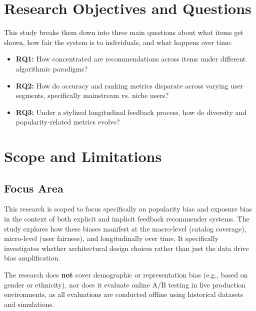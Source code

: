 \documentclass[11pt,a4paper]{report}
\begin{document}
\section{Research Objectives and Questions}
This study breaks them down into three main questions about what items get shown, how fair the system is to individuals, and what happens over time:

\begin{itemize}
    \item \textbf{RQ1:} How concentrated are recommendations across items under different algorithmic paradigms?
    \item \textbf{RQ2:} How do accuracy and ranking metrics disparate across varying user segments, specifically mainstream vs. niche users?
    \item \textbf{RQ3:} Under a stylized longitudinal feedback process, how do diversity and popularity-related metrics evolve?
\end{itemize}

\section{Scope and Limitations}

\subsection{Focus Area}
This research is scoped to focus specifically on popularity bias and exposure bias in the context of both explicit and implicit feedback recommender systems. The study explores how these biases manifest at the macro-level (catalog coverage), micro-level (user fairness), and longitudinally over time. It specifically investigates whether architectural design choices rather than just the data drive bias amplification.

The research does \textbf{not} cover demographic or representation bias (e.g., based on gender or ethnicity), nor does it evaluate online A/B testing in live production environments, as all evaluations are conducted offline using historical datasets and simulations.
\end{document}
